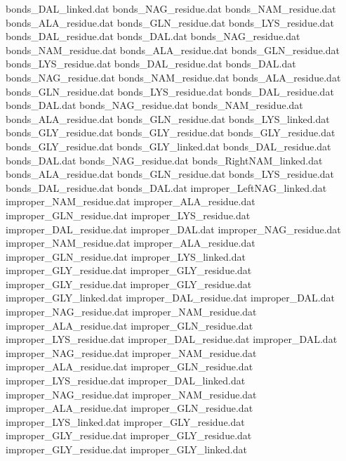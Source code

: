 bonds_DAL_linked.dat            
bonds_NAG_residue.dat           
bonds_NAM_residue.dat           
bonds_ALA_residue.dat           
bonds_GLN_residue.dat           
bonds_LYS_residue.dat           
bonds_DAL_residue.dat           
bonds_DAL.dat                   
bonds_NAG_residue.dat           
bonds_NAM_residue.dat           
bonds_ALA_residue.dat           
bonds_GLN_residue.dat           
bonds_LYS_residue.dat           
bonds_DAL_residue.dat           
bonds_DAL.dat                   
bonds_NAG_residue.dat           
bonds_NAM_residue.dat           
bonds_ALA_residue.dat           
bonds_GLN_residue.dat           
bonds_LYS_residue.dat           
bonds_DAL_residue.dat           
bonds_DAL.dat                   
bonds_NAG_residue.dat           
bonds_NAM_residue.dat           
bonds_ALA_residue.dat           
bonds_GLN_residue.dat           
bonds_LYS_linked.dat            
bonds_GLY_residue.dat
bonds_GLY_residue.dat
bonds_GLY_residue.dat
bonds_GLY_residue.dat
bonds_GLY_linked.dat
bonds_DAL_residue.dat           
bonds_DAL.dat                   
bonds_NAG_residue.dat           
bonds_RightNAM_linked.dat       
bonds_ALA_residue.dat           
bonds_GLN_residue.dat           
bonds_LYS_residue.dat           
bonds_DAL_residue.dat           
bonds_DAL.dat                   
improper_LeftNAG_linked.dat     
improper_NAM_residue.dat        
improper_ALA_residue.dat        
improper_GLN_residue.dat        
improper_LYS_residue.dat        
improper_DAL_residue.dat        
improper_DAL.dat                
improper_NAG_residue.dat        
improper_NAM_residue.dat        
improper_ALA_residue.dat        
improper_GLN_residue.dat        
improper_LYS_linked.dat         
improper_GLY_residue.dat
improper_GLY_residue.dat
improper_GLY_residue.dat
improper_GLY_residue.dat
improper_GLY_linked.dat
improper_DAL_residue.dat        
improper_DAL.dat                
improper_NAG_residue.dat        
improper_NAM_residue.dat        
improper_ALA_residue.dat        
improper_GLN_residue.dat        
improper_LYS_residue.dat        
improper_DAL_residue.dat        
improper_DAL.dat                
improper_NAG_residue.dat        
improper_NAM_residue.dat        
improper_ALA_residue.dat        
improper_GLN_residue.dat        
improper_LYS_residue.dat        
improper_DAL_linked.dat         
improper_NAG_residue.dat        
improper_NAM_residue.dat        
improper_ALA_residue.dat        
improper_GLN_residue.dat        
improper_LYS_linked.dat         
improper_GLY_residue.dat
improper_GLY_residue.dat
improper_GLY_residue.dat
improper_GLY_residue.dat
improper_GLY_linked.dat
